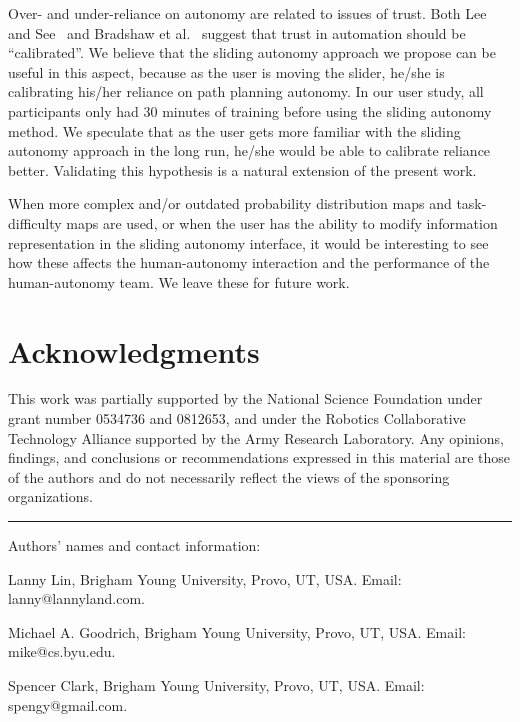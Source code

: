 \documentclass[lettersize, apacite, twoside, HRI]{apa_HRI}
\begin{document}
Over- and under-reliance on autonomy are related to issues of trust.  Both Lee and See~\cite{Lee2004Trust} and Bradshaw et al.\ \cite{Bradshaw2013Seven} suggest that trust in automation should be ``calibrated''. We believe that the sliding autonomy approach we propose can be useful in this aspect, because as the user is moving the slider, he/she is calibrating his/her reliance on path planning autonomy. In our user study, all participants only had 30 minutes of training before using the sliding autonomy method. We speculate that as the user gets more familiar with the sliding autonomy approach in the long run, he/she would be able to calibrate reliance better. Validating this hypothesis is a natural extension of the present work.

When more complex and/or outdated probability distribution maps and task-difficulty maps are used, or when the user has the ability to modify information representation in the sliding autonomy interface, it would be interesting to see how these affects the human-autonomy interaction and the performance of the human-autonomy team. We leave these for future work.

\section*{Acknowledgments}

This work was partially supported by 
the National Science Foundation 
under grant number 
0534736 and 0812653, 
and under the Robotics Collaborative Technology Alliance supported by the Army Research Laboratory. Any opinions, findings, and conclusions or recommendations expressed in this material are those of the authors and do not necessarily reflect the views of the sponsoring organizations.



\hrule
\vspace*{.1in}
Authors' names and contact information: 

Lanny Lin, Brigham Young University, Provo, UT, USA.  Email: lanny@lannyland.com.  

Michael A. Goodrich, Brigham Young University, Provo, UT, USA.  Email: mike@cs.byu.edu.

Spencer Clark, Brigham Young University, Provo, UT, USA.  Email: spengy@gmail.com.
\end{document}
